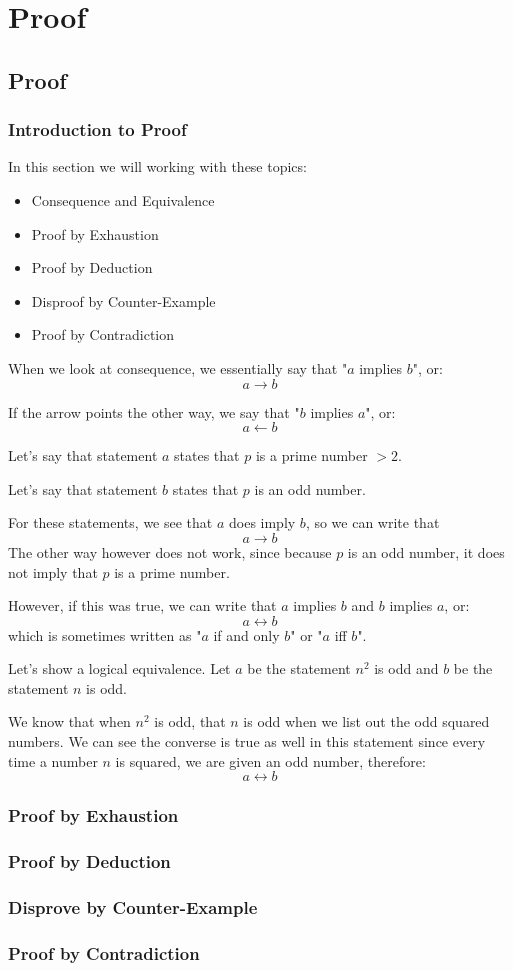 \documentclass[../maths.tex]{subfiles}
\begin{document}
\chapter{Proof}
\section{Proof}
\subsection*{Introduction to Proof}
In this section we will working with these topics:
\begin{itemize}
    \item Consequence and Equivalence
    \item Proof by Exhaustion
    \item Proof by Deduction
    \item Disproof by Counter-Example
    \item Proof by Contradiction
\end{itemize}

When we look at consequence, we essentially say that "$a$ implies $b$", or:
\[a\rightarrow b\]

If the arrow points the other way, we say that "$b$ implies $a$", or:
\[a\leftarrow b\]

Let's say that statement $a$ states that $p$ is a prime number $>2$.

Let's say that statement $b$ states that $p$ is an odd number.

For these statements, we see that $a$ does imply $b$, so we can write that
\[a\rightarrow b\]
The other way however does not work, since because $p$ is an odd number, it does not imply that $p$ is a prime number.

However, if this was true, we can write that $a$ implies $b$ and $b$ implies $a$, or:
\[a\leftrightarrow b\]
which is sometimes written as "$a$ if and only $b$" or "$a$ iff $b$".

Let's show a logical equivalence. Let $a$ be the statement $n^2$ is odd and $b$ be the statement $n$ is odd.

We know that when $n^2$ is odd, that $n$ is odd when we list out the odd squared numbers. We can see the converse is true as well in this statement since every time a number $n$ is squared, we are given an odd number, therefore:
\[a\leftrightarrow b\]
\subsection*{Proof by Exhaustion}
\subsection*{Proof by Deduction}
\subsection*{Disprove by Counter-Example}
\subsection*{Proof by Contradiction}
\end{document}

